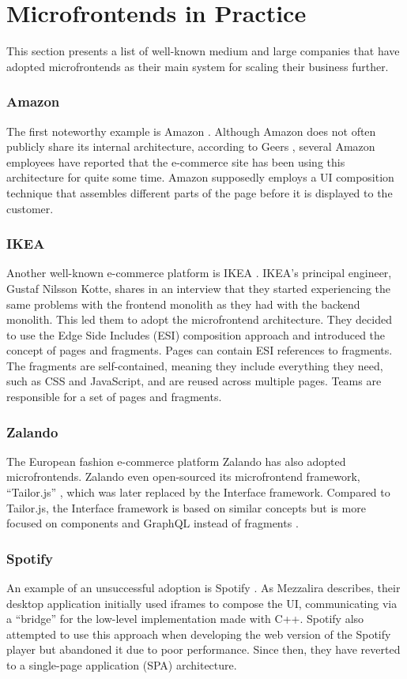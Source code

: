 \section{Microfrontends in Practice}
This section presents a list of well-known medium and large companies that have adopted microfrontends as their main system for scaling their business further.

\subsubsection*{Amazon}
The first noteworthy example is Amazon \cite{Amazon}. Although Amazon does not often publicly share its internal architecture, according to Geers \cite{Geers}, several Amazon employees have reported that the e-commerce site has been using this architecture for quite some time. Amazon supposedly employs a UI composition technique that assembles different parts of the page before it is displayed to the customer.

\subsubsection*{IKEA}
Another well-known e-commerce platform is IKEA \cite{IKEA}. IKEA's principal engineer, Gustaf Nilsson Kotte, shares in an interview \cite{StenbergIkea} that they started experiencing the same problems with the frontend monolith as they had with the backend monolith. This led them to adopt the microfrontend architecture. They decided to use the Edge Side Includes (ESI) composition approach and introduced the concept of pages and fragments. Pages can contain ESI references to fragments. The fragments are self-contained, meaning they include everything they need, such as CSS and JavaScript, and are reused across multiple pages. Teams are responsible for a set of pages and fragments.

\subsubsection*{Zalando}
The European fashion e-commerce platform Zalando \cite{Zalando} has also adopted microfrontends. Zalando even open-sourced its microfrontend framework, ``Tailor.js'' \cite{TailorJs}, which was later replaced by the Interface framework. Compared to Tailor.js, the Interface framework is based on similar concepts but is more focused on components and GraphQL instead of fragments \cite{MezzaliraBuildingMf}.

\subsubsection*{Spotify}
An example of an unsuccessful adoption is Spotify \cite{Spotify}. As Mezzalira \cite{MezzaliraBuildingMf} describes, their desktop application initially used iframes to compose the UI, communicating via a ``bridge'' for the low-level implementation made with C++. Spotify also attempted to use this approach when developing the web version of the Spotify player but abandoned it due to poor performance. Since then, they have reverted to a single-page application (SPA) architecture.

